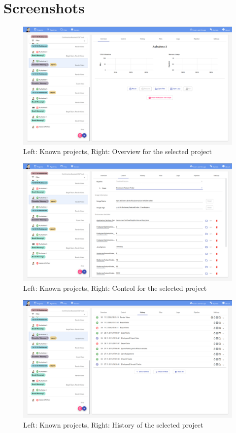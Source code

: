 \chapter{Screenshots}
\label{appendix:screenshots}

\begin{figure}[H]
	\centering
	\includegraphics[width=1.0\textwidth]{screenshots/01_project_overview.png}
	\caption{Left: Known projects, Right: Overview for the selected project}
\end{figure}

\begin{figure}[H]
	\centering
	\includegraphics[width=1.0\textwidth]{screenshots/02_project_control.png}
	\caption{Left: Known projects, Right: Control for the selected project}
\end{figure}

\begin{figure}[H]
	\centering
	\includegraphics[width=1.0\textwidth]{screenshots/03_project_history.png}
	\caption{Left: Known projects, Right: History of the selected project}
\end{figure}

